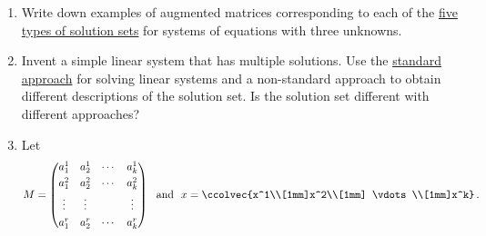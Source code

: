 

\begin{enumerate}

\item Write down examples of augmented matrices corresponding to each of the \hyperlink{FIVE}{five types of solution sets} for systems of equations with three unknowns.


\item Invent  a simple linear system that has multiple solutions. Use the \hyperlink{standard approach}{standard approach} for solving linear systems and a non-standard approach to obtain  different descriptions of the solution set.  Is the solution set different with different approaches? 

%
\item \label{matvect} Let
\label{matrixmult}
\[ M = \begin{pmatrix}
      a^1_1 & a^1_2  & \cdots & a^1_k  \\[1mm]
      a^2_1 & a^2_2  & \cdots & a^2_k  \\[1mm]
      \multicolumn{1}{c}{\vdots} & \multicolumn{1}{c}{\vdots}   &     & \multicolumn{1}{c}{\vdots}  \\[1mm]
      a^r_1 & a^r_2  & \cdots & a^r_k  
    \end{pmatrix}\ \mbox{ and } \ x=\ccolvec{x^1\\[1mm]x^2\\[1mm] \vdots \\[1mm]x^k}
    \, .
\]


\end{enumerate}
